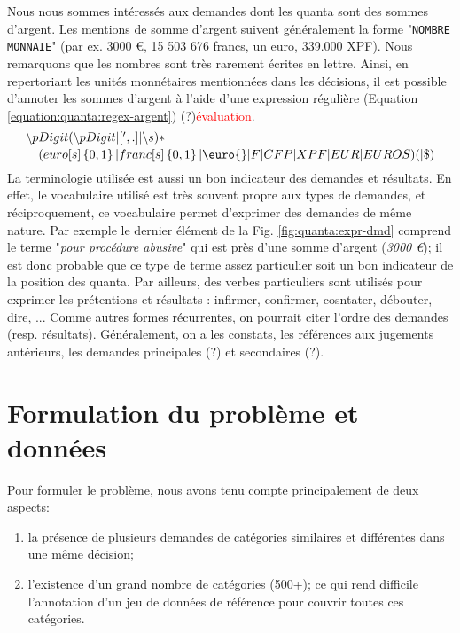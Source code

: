 Nous nous sommes intéressés aux demandes dont les quanta sont des sommes d'argent. Les mentions de somme d'argent suivent généralement la forme "\verb=NOMBRE MONNAIE=" (par ex. 3000 \euro{}, 15 503 676 francs, un euro, 339.000 XPF). Nous remarquons que les nombres sont très rarement écrites en lettre. Ainsi, en repertoriant les unités monnétaires mentionnées dans les décisions, il est possible d'annoter les sommes d'argent à l'aide d'une expression régulière (Equation \ref{equation:quanta:regex-argent}) (?)\textcolor{red}{évaluation}.
\begin{equation} %
\splitdfrac{\backslash p{Digit}(\backslash p{Digit}|[',.]|\backslash s)*}{(euro[s]\left\{0,1\right\}|franc[s]\left\{0,1\right\}|\euro{}|F|CFP|XPF|EUR|EUROS)( |\$)}\label{equation:quanta:regex-argent} %
\end{equation}
La terminologie utilisée est aussi un bon indicateur des demandes et résultats. En effet, le vocabulaire utilisé est très souvent propre aux types de demandes, et réciproquement, ce vocabulaire permet d'exprimer des demandes de même nature. Par exemple le dernier élément de la Fig. \ref{fig:quanta:expr-dmd} comprend le terme "\textit{pour procédure abusive}" qui est près d'une somme d'argent (\textit{3000 \euro{}}); il est donc probable que ce type de terme assez particulier soit un bon indicateur de la position des quanta. Par ailleurs, des verbes particuliers sont utilisés pour exprimer les prétentions et résultats : infirmer, confirmer, cosntater, débouter, dire, ... Comme autres formes récurrentes, on pourrait citer l'ordre des demandes (resp. résultats). Généralement, on a les constats, les références aux jugements antérieurs, les demandes principales (?) et secondaires (?).

\section{Formulation du problème et données}
\label{sec:quanta:formulation}
Pour formuler le problème, nous avons tenu compte principalement de deux aspects:
\begin{enumerate}
    \item la présence de plusieurs demandes de catégories similaires et différentes dans une même décision;
    \item l'existence d'un grand nombre de catégories (500+); ce qui rend difficile l'annotation d'un jeu de données de référence pour couvrir toutes ces catégories.
\end{enumerate}

